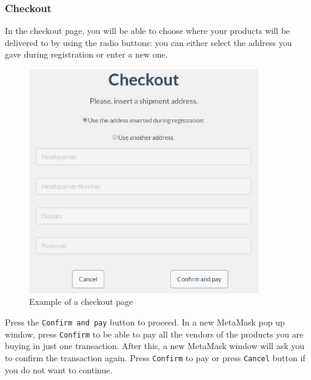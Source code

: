 	\subsubsection{Checkout}
	In the checkout page, you will be able to choose where your products will be 
	delivered to by using the radio buttons: you can either select the address 
	you gave during registration or enter a new one.\\
	\begin{figure}[H]
		\includegraphics[width=10cm]{res/images/checkout.png}
		\centering
		\caption{Example of a checkout page}
	\end{figure}
	\noindent Press the \texttt{Confirm and pay} button to proceed. In a new 
	MetaMask\glo{} pop up window, press \texttt{Confirm} to be able to pay all the 
	vendors of the products you are buying in just one transaction. After this, 
	a new MetaMask\glo{} window will ask you to confirm the transaction again. Press \texttt{Confirm} to pay or press
	 \texttt{Cancel} button if you do not want to continue.
	
